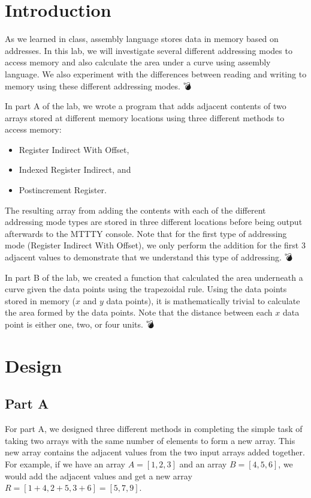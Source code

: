 \documentclass[10pt, letterpaper, titlepage]{article} %
\title{\textbf{\Huge{
\begin{center}
Introduction to\\ Addressing Modes\\ 👌👌👌 \\
\end{center}
}}}
\author{\B enjamin Kong | 1573684\\Lora Ma ||||| 1570935\\ \\ECE 212 Lab Section H11}
\begin{document}
 
\maketitle 
\thispagestyle{empty}
\tableofcontents 
\newpage
{}

\begin{multicols*}{2}


\section{Introduction}
As we learned in class, assembly language stores data in memory based on addresses. 
In this lab, we will investigate several different addressing modes to access memory and also calculate the area under a curve using assembly language. 
We also experiment with the differences between reading and writing to memory using these different addressing modes. 💣

In part A of the lab, we wrote a program that adds adjacent contents of two arrays stored at different memory locations using three different methods to access memory:
\begin{itemize}
	\item Register Indirect With Offset,
	\item Indexed Register Indirect, and
	\item Postincrement Register.
\end{itemize}
The resulting array from adding the contents with each of the different addressing mode types are stored in three different locations before being output afterwards to the MTTTY console. 
Note that for the first type of addressing mode (Register Indirect With Offset), we only perform the addition for the first 3 adjacent values to demonstrate that we understand this type of addressing. 💣

In part B of the lab, we created a function that calculated the area underneath a curve given the data points using the trapezoidal rule. 
Using the data points stored in memory ($x$ and $y$ data points), it is mathematically trivial to calculate the area formed by the data points. 
Note that the distance between each $x$ data point is either one, two, or four units. 💣

\section{Design}
\subsection{Part A}
For part A, we designed three different methods in completing the simple task of taking two arrays with the same number of elements to form a new array.
This new array contains the adjacent values from the two input arrays added together.
For example, if we have an array $A = [1, 2, 3]$ and an array $B = [4, 5, 6]$, we would add the adjacent values and get a new array $R = [1 + 4, 2 + 5, 3 + 6] = [5, 7, 9]$. 🍄🍄


\end{multicols*}
\end{document}
